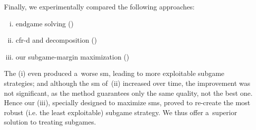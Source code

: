 Finally, we experimentally compared the following approaches:
\begin{enumerate}[(i)]
  \item endgame solving (\cite{Ganzfried2015endgame})
  \item \acrshort{cfr-d} and decomposition (\cite{BurchJohansonBowling2014})
  \item our subgame-margin maximization (\cite{Moravcik2016refining})
\end{enumerate}
The (i) even produced a~worse \acrshort{sm}, leading to more exploitable subgame strategies;
and although the \acrshort{sm} of~(ii) increased over time, the improvement was not significant, as the method guarantees only the same quality, not the best one.
Hence our (iii), specially designed to maximize \acrshort{sm}s, proved to re-create the most robust (i.e. the least exploitable) subgame strategy.
We thus offer a~superior solution to treating subgames.
